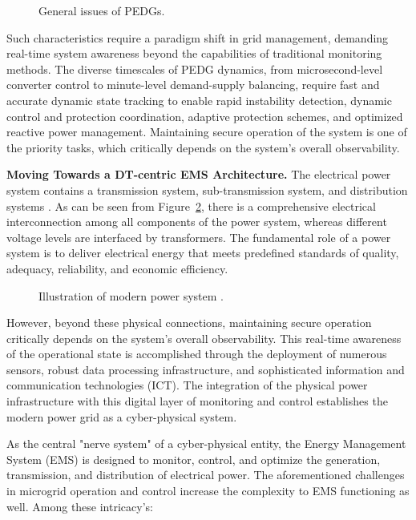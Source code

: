 \begin{figure}[ht]
    \caption{General issues of PEDGs.}\label{fig:general_issues}
\end{figure}

Such characteristics require a paradigm shift in grid management, demanding real-time system awareness beyond the capabilities of traditional monitoring methods. The diverse timescales of PEDG dynamics, from microsecond-level converter control to minute-level demand-supply balancing, require fast and accurate dynamic state tracking to enable rapid instability detection, dynamic control and protection coordination, adaptive protection schemes, and optimized reactive power management. Maintaining secure operation of the system is one of the priority tasks, which critically depends on the system's overall observability.


\textbf{Moving Towards a DT-centric EMS Architecture.}
The electrical power system contains a transmission system, sub-transmission system, and distribution systems \autocite{kundur1994power}. As can be seen from Figure~\cref{fig:ps_illustration}, there is a comprehensive electrical interconnection among all components of the power system, whereas different voltage levels are interfaced by transformers. The fundamental role of a power system is to deliver electrical energy that meets predefined standards of quality, adequacy, reliability, and economic efficiency. 

\begin{figure}[ht]
    \caption{Illustration of modern power system \cite{Prostejovsky2017}.}\label{fig:ps_illustration}
\end{figure}

However, beyond these physical connections, maintaining secure operation critically depends on the system's overall observability. This real-time awareness of the operational state is accomplished through the deployment of numerous sensors, robust data processing infrastructure, and sophisticated information and communication technologies (ICT). The integration of the physical power infrastructure with this digital layer of monitoring and control establishes the modern power grid as a cyber-physical system. 


As the central "nerve system" of a cyber-physical entity, the Energy Management System (EMS) is designed to monitor, control, and optimize the generation, transmission, and distribution of electrical power. The aforementioned challenges in microgrid operation and control increase the complexity to EMS functioning as well. Among these intricacy's: 

